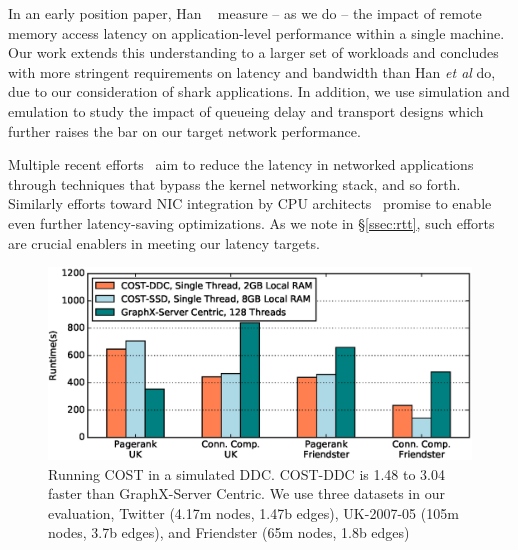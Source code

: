 
In an early position paper, Han \etal~\cite{hotnets} measure -- as we do -- the impact of remote memory access latency on application-level performance within a single machine. Our work extends this  understanding to a larger set of workloads and concludes with more stringent requirements on latency and bandwidth than Han {\it et al} do, due to our consideration of shark applications. In addition, we use simulation and emulation to study the impact of queueing delay and transport designs which further raises the bar on our target network performance.


Multiple recent efforts~\cite{farm,mica,herd,ramcloud} aim to reduce the latency in networked applications through techniques that bypass the kernel networking stack, and so forth. %
Similarly efforts toward NIC integration by CPU architects~\cite{cpu-nic} promise to enable even further latency-saving optimizations. As we note in \S\ref{ssec:rtt}, such efforts are crucial enablers in meeting our latency targets. 










\begin{figure}
  \centering
    \includegraphics[width = \columnwidth]{img/benefit_uk.eps} 
  \caption{\small{Running COST in a simulated DDC. COST-DDC is 1.48 to 3.04 faster than GraphX-Server Centric. We use three datasets in our evaluation, Twitter (4.17m nodes, 1.47b edges), UK-2007-05 (105m nodes, 3.7b edges), and Friendster (65m nodes, 1.8b edges)}}
  \label{fig:benefit}
\end{figure}







